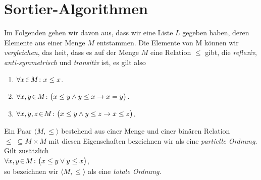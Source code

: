\chapter{Sortier-Algorithmen}
Im Folgenden gehen wir davon aus, dass wir eine Liste $L$ gegeben haben, deren Elemente
aus einer Menge $M$ entstammen.  
Die Elemente von M k\"onnen wir \emph{vergleichen}, das
hei\3t, dass es auf der Menge $M$  eine Relation
$\leq$ gibt, die \emph{reflexiv}, \emph{anti-symmetrisch} und \emph{transitiv} ist, es gilt also  
\begin{enumerate}
\item $\forall x \!\in\! M \colon x \leq x$.
\item $\forall x, y \!\in\! M \colon \bigl(x \leq y \wedge y \leq x \rightarrow x = y\bigr)$.
\item $\forall x, y, z \!\in\! M \colon \bigl(x \leq y \wedge y \leq z \rightarrow x \leq z\bigr)$. 
\end{enumerate}
Ein Paar $\langle M, \leq \rangle$ bestehend aus einer Menge und einer bin\"aren Relation
$\leq \;\subseteq M \times M$ mit diesen Eigenschaften bezeichnen wir als eine
\emph{partielle Ordnung}.  Gilt zus\"atzlich \\[0.2cm]
\hspace*{1.3cm} $\forall x, y \!\in\! M \colon\bigl( x \leq y \vee y \leq x\bigr)$, \\[0.2cm]
so bezeichnen wir $\langle M, \leq \rangle$ als eine \emph{totale Ordnung}.
\vspace*{0.3cm}

